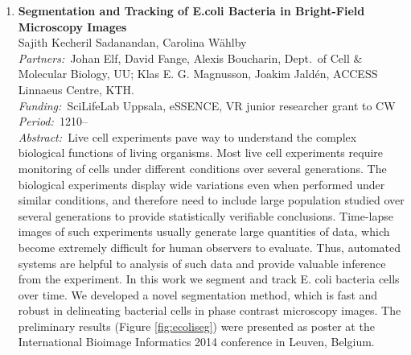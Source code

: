 \documentclass[10pt, a4paper]{article}
\newcommand{\aabstract}[1]{\emph{Abstract:~}#1}
\newcommand{\ffunding}[1]{\emph{Funding:~}#1\\}
\newcommand{\ppartners}[1]{\emph{Partners:~}#1\\}
\newcommand{\pperiod}[1]{\emph{Period:~}#1\\}
\begin{document}
{\begin{enumerate}
{Immunohistochemistry can facilitate the quantification of biomarkers such as estrogen, progesterone, and the human epidermal growth factor 2 receptors, in addition to Ki-67 proteins that are associated with cell growth and proliferation. We developed a method for the identification of paired antibodies based on correlating probability maps of immunostaining patterns across adjacent tissue sections. Samples from the Human Protein Atlas project were used to test the method.

We also developed a new feature descriptor for characterizing glandular structure and tissue architecture, which form an important component of Gleason and tubule-based Elston grading. The method is based on defining shape-preserving, neighborhood annuli around lumen regions. 

These two studies were accepted as journal papers. Jimmy Azar defended his PhD thesis closely linked to this project in October 2014.}



\item 
\textbf{Segmentation and Tracking of E.coli Bacteria in Bright-Field Microscopy Images}\\
Sajith Kecheril Sadanandan, Carolina W\"{a}hlby\\
\ppartners{Johan Elf, David Fange, Alexis Boucharin, Dept.~of Cell \& Molecular Biology, UU; Klas E. G. Magnusson, Joakim Jald\'en, ACCESS Linnaeus Centre, KTH.}
\ffunding{SciLifeLab Uppsala, eSSENCE, VR junior researcher grant to CW}
\pperiod{1210--}
\aabstract{Live cell experiments pave way to understand the complex biological functions of living organisms. Most live cell experiments require monitoring of cells under different conditions over several generations. The biological experiments display wide variations even when performed under similar conditions, and therefore need to include large population studied over several generations to provide statistically verifiable conclusions. Time-lapse images of such experiments usually generate large quantities of data, which become extremely difficult for human observers to evaluate. Thus, automated systems are helpful to analysis of such data and provide valuable inference from the experiment. In this work we segment and track E. coli bacteria cells over time. We developed a novel segmentation method, which is fast and robust in delineating bacterial cells in phase contrast microscopy images. The preliminary results (Figure \ref{fig:ecoliseg}) were presented as poster at the International Bioimage Informatics 2014 conference in Leuven, Belgium.}


\end{enumerate}}
\end{document}
